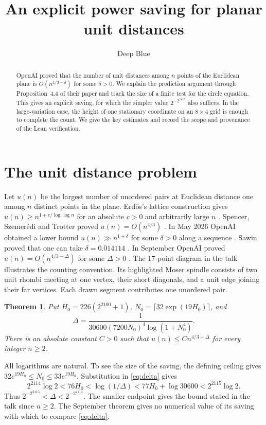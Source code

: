 \documentclass[11pt,letterpaper,oneside,reqno]{amsart}
\title{An explicit power saving for planar unit distances}
\date{}
\author[]{Deep Blue}
\newtheorem{mainthm}{Theorem}
\theoremstyle{definition}
\begin{document}
\begin{abstract}
OpenAI proved that the number of unit distances among \(n\) points of
the Euclidean plane is \(O(n^{4/3-\delta})\) for some \(\delta>0\).
We explain the prediction argument through Proposition~4.4 of their
paper and track the size of a finite test for the circle equation.
This gives an explicit saving, for which the simpler value
\(2^{-2^{2115}}\) also suffices. In the large-variation case, the
height of one stationary coordinate on an \(8\times4\) grid is
enough to complete the count. We give the key estimates and record
the scope and provenance of the Lean verification.
\end{abstract}
\maketitle
\thispagestyle{plain}
\section{The unit distance problem}
Let \(u(n)\) be the largest number of unordered pairs at Euclidean distance
one among \(n\) distinct points in the plane. Erd\H{o}s's lattice
construction gives \(u(n)\ge n^{1+c/\log\log n}\) for an absolute \(c>0\)
and arbitrarily large \(n\) \cite{E}. Spencer, Szemer\'edi and Trotter
proved \(u(n)=O(n^{4/3})\) \cite{SST}. In May 2026 OpenAI obtained a
lower bound \(u(n)\gg n^{1+\delta}\) for some \(\delta>0\) along a
sequence \cite{OAI1}. Sawin proved that one can take
\(\delta=0.014114\) \cite[Theorem~1]{S}. In September OpenAI proved
\(u(n)=O(n^{4/3-\Delta})\) for some \(\Delta>0\) \cite{OAI2}.
The 17-point diagram in the talk illustrates the counting convention.
Its highlighted Moser spindle consists of two unit rhombi meeting at one
vertex, their short diagonals, and a unit edge joining their far vertices.
Each drawn segment contributes one unordered pair.

\begin{mainthm}\label{thm:main}
Put \(H_0=226(2^{2100}+1)\), \(N_0=\lceil 32\exp(19H_0)\rceil\), and
\begin{equation}\label{eq:delta}
  \Delta=\frac{1}{30600(7200N_0)^4\log(1+N_0^4)}.
\end{equation}
There is an absolute constant \(C>0\) such that
\(u(n)\le Cn^{4/3-\Delta}\) for every integer \(n\ge2\).
\end{mainthm}

All logarithms are natural. To see the size of the saving, the defining
ceiling gives \(32e^{19H_0}\le N_0\le33e^{19H_0}\). Substitution in
\eqref{eq:delta} gives
\[
  2^{2114}\log 2<76H_0<\log(1/\Delta)
  <77H_0+\log 30600<2^{2115}\log 2 .
\]
Thus \(2^{-2^{2115}}<\Delta<2^{-2^{2114}}\). The smaller endpoint
gives the bound stated in the talk since \(n\ge2\). The September
theorem gives no numerical value of its saving with which to compare
\eqref{eq:delta}.
\end{document}
